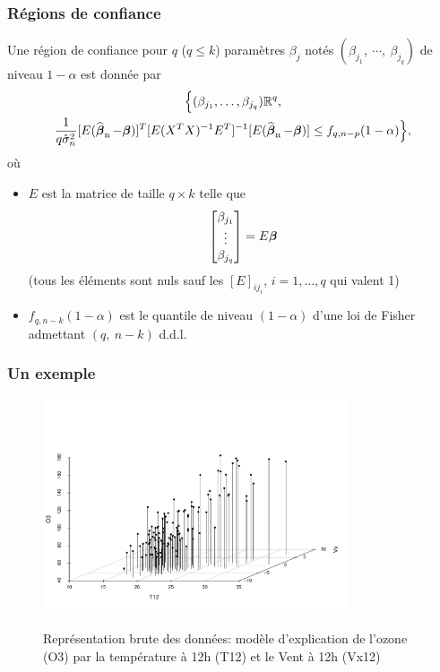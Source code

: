 \begin{frame}
\frametitle{Régions de confiance}
\begin{theo}
 Une région de confiance  pour $q$ ($q\leq k$)  param\`{e}tres $\beta_{j}$ notés $(\beta_{j_{1}},\ \cdots,\ \beta_{j_{q}})$ de niveau
 $ 1-\alpha$ est donn\'{e}e  par
\begin{multline*}
\Big\{(\beta_{j_1},\dots,\beta_{j_q}) \mathbb{R}^q, \\ \frac{1}{q\hat{\sigma}_n^{2}}[E(\operatorname{\widehat{\boldsymbol{\beta}}_n}-\boldsymbol{\beta})]^T[E(X^TX)^{-1}E^T]^{-1}[E(\operatorname{\widehat{\boldsymbol{\beta}}_n}-\boldsymbol{\beta})]\leq f_{q,n-p}(1-\alpha)\Big\},
\end{multline*}
o\`{u} 
\begin{itemize}
\item $E$ est la matrice de taille $q\times k$ telle que 
$$
\left[
\begin{matrix}
  \beta_{j_1} \\
  \vdots \\
  \beta_{j_q}
\end{matrix}
\right]
= E \boldsymbol{\beta} 
$$
(tous les éléments sont nuls sauf les $[E]_{ij_{i}}$, $i=1,\dots,q$ qui valent 1) 
\item $f_{q,n-k}(1-\alpha)$ est le quantile de niveau $(1-\alpha)$ d'une loi de Fisher admettant $(q,\ n-k)$ d.d.l.
\end{itemize}
\end{theo}
\end{frame}

\begin{frame}
\frametitle{Un exemple}
\begin{figure}
  \centering
  \includegraphics[width=0.8\textwidth]{ScatterPlot}\\
  \caption{Représentation brute des données: modèle d'explication de l'ozone (O3) par la température à 12h (T12) et le Vent à 12h (Vx12)}
\end{figure}
\end{frame}


